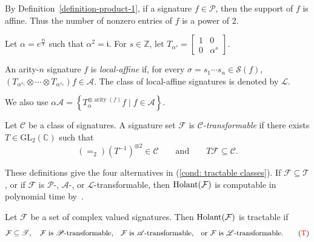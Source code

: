 By Definition~\ref{definition-product-1}, if a signature $f\in\mathscr{P}$, then the support of $f$ is affine.
Thus the number of nonzero entries of $f$ is a power of 2.

Let $\alpha=e^{\frac{\pi \mathfrak i}{4}}$ such that $\alpha^2=\mathfrak i.$
For $s\in\mathbb Z$, let
\(
T_{\alpha^s}=\left[\begin{smallmatrix}1&0\\0&\alpha^s\end{smallmatrix}\right].
\)

\begin{definition}
An arity-$n$ signature $f$ is \emph{local-affine} if, for every
$\sigma=s_1\cdots s_n\in\mathscr S(f)$,
\(
\left(T_{\alpha^{s_1}}\otimes\cdots\otimes
      T_{\alpha^{s_n}}\right)f\in\mathscr A.
\)
The class of local-affine signatures is denoted by $\mathscr L$.
\end{definition}

We also use
\(
\alpha\mathscr A
=\left\{T_\alpha^{\otimes\operatorname{arity}(f)}f\mid 
  f\in\mathscr A\right\}.
\)

\begin{definition}[Transformable]
Let $\mathscr C$ be a class of signatures.  A signature set $\mathcal F$
is \emph{$\mathscr C$-transformable} if there exists
$T\in\mathrm{GL}_2(\mathbb C)$ such that
\[
(=_2)(T^{-1})^{\otimes2}\in\mathscr C
\qquad\text{and}\qquad
T\mathcal F\subseteq\mathscr C.
\]
\end{definition}

These definitions give the four alternatives in
\textup{(\ref{cond: tractable classes})}.  If
$\mathcal F\subseteq\mathscr T$, or if $\mathcal F$ is
$\mathscr P$-, $\mathscr A$-, or $\mathscr L$-transformable, then
$\operatorname{Holant}(\mathcal F)$ is computable in polynomial time
by~\cite{realholant}.


\begin{theorem}\label{thm: tractable classes}
    Let $\mathcal{F}$ be a set of complex valued signatures.
    Then $\operatorname{Holant}(\mathcal{F})$ is tractable if
    \begin{equation}\label{cond: tractable classes}
    \mathcal{F}\subseteq \mathscr{T}, ~~~
     \mathcal{F} \text{ is }\mathscr{P}\text{-transformable,}~~~
     \mathcal{F} \text{ is } \mathscr{A}\text{-transformable,~~~or~} 
     \mathcal{F} \text{ is } \mathscr{L}\text{-transformable.}\tag{$\mathrm{ \textcolor{red}{T}}$}
     \end{equation}
\end{theorem}

